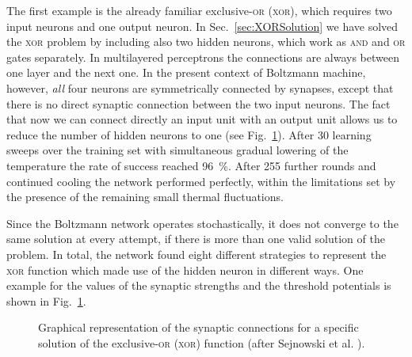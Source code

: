The first example is the already familiar exclusive-\textsc{or} (\textsc{xor}), which requires two input neurons and one output neuron. In Sec.~\ref{sec:XORSolution} we have solved the \textsc{xor} problem by including also two hidden neurons, which work as \textsc{and} and \textsc{or} gates separately. In multilayered perceptrons the connections are always between one layer and the next one. In the present context of Boltzmann machine, however, \emph{all} four neurons are symmetrically connected by synapses, except that there is no direct synaptic connection between the two input neurons. The fact that now we can connect directly an input unit with an output unit allows us to reduce the number of hidden neurons to one (see Fig.~\ref{XORBoltzmann}). After 30 learning sweeps over the training set with simultaneous gradual lowering of the temperature the rate of success reached \SI{96}{\percent}. After 255 further rounds and continued cooling the network performed perfectly, within the limitations set by the presence of the remaining small thermal fluctuations.

Since the Boltzmann network operates stochastically, it does not converge to the same solution at every attempt, if there is more than one valid solution of the problem. In total, the network found eight different strategies to represent the \textsc{xor} function which made use of the hidden neuron in different ways. One example for the values of the synaptic strengths and the threshold potentials is shown in Fig.~\ref{XORBoltzmann}.
\begin{figure}[h!t]
\centering
{}
\caption{Graphical representation of the synaptic connections for a specific solution of the exclusive-\textsc{or} (\textsc{xor}) function (after Sejnowski et al. \cite{Sejnowski}).}\label{XORBoltzmann}
\end{figure}

